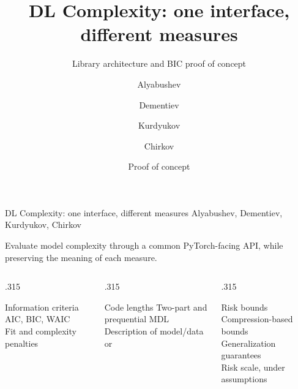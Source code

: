 \documentclass[aspectratio=169,notheorems]{beamer}
\title{DL Complexity: one interface, different measures}
\subtitle{Library architecture and BIC proof of concept}
\author{Alyabushev \and Dementiev \and Kurdyukov \and Chirkov}
\date{Proof of concept}
\begin{document}
\begin{frame}{DL Complexity: one interface, different measures}
\small
{\footnotesize Alyabushev, Dementiev, Kurdyukov, Chirkov
\hfill {}}

\medskip
Evaluate model complexity through a common PyTorch-facing API,
while preserving the meaning of each measure.

\medskip
\centering
{}
\par
\medskip
\begin{columns}[T,onlytextwidth]
  \begin{column}{.315\textwidth}
    \begin{block}{Information criteria}
      \small AIC, BIC, WAIC\\[3pt]
      Fit and complexity penalties\\
    \end{block}
  \end{column}
  \begin{column}{.315\textwidth}
    \begin{block}{Code lengths}
      \small Two-part and prequential MDL\\[3pt]
      Description of model/data\\
       or 
    \end{block}
  \end{column}
  \begin{column}{.315\textwidth}
    \begin{block}{Risk bounds}
      \small Compression-based bounds\\[3pt]
      Generalization guarantees\\
      Risk scale, under assumptions
    \end{block}
  \end{column}
\end{columns}
\raggedright
\medskip
{}
\end{frame}
\end{document}
